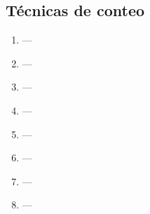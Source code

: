 \subsection{Técnicas de conteo}

\begin{enumerate}
\item  ---
\item  ---
\item  ---
\item  ---
\item  ---
\item  ---
\item  ---
\item  ---

\end{enumerate}
